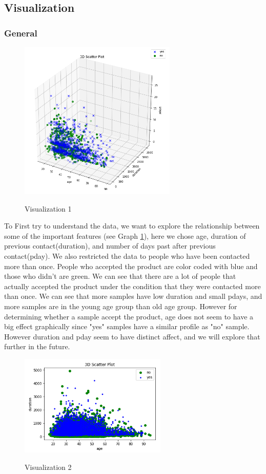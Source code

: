 \documentclass{mytemplate}%
\begin{document}
\begin{multicols}{2}
\subsection{Visualization}
\subsubsection{General}
\begin{figure}[H]
  \centering
  \includegraphics[width=7.5cm]{3d_age_dur_pd.PNG}\\
  \caption{Visualization 1}\label{g01}
\end{figure}

To First try to understand the data, we want to explore the relationship between some of the important features (see {\color{red}Graph \ref{g01}}), here we chose age, duration of previous contact(duration), and number of days past after previous contact(pday). We also restricted the data to people who have been contacted more than once. People who accepted the product are color coded with blue and those who didn't are green. We can see that there are a lot of people that actually accepted the product under the condition that they were contacted more than once. We can see that more samples have low duration and small pdays, and more samples are in the young age group than old age group. However for determining whether a sample accept the product, age does not seem to have a big effect graphically since "yes" samples have a similar profile as "no" sample. However duration and pday seem to have distinct affect, and we will explore that further in the future.
\begin{figure}[H]
  \centering
  \includegraphics[width=7cm]{age_dur_scatter.PNG}\\
  \caption{Visualization 2}\label{g02}
\end{figure}


\end{multicols}
\end{document}

